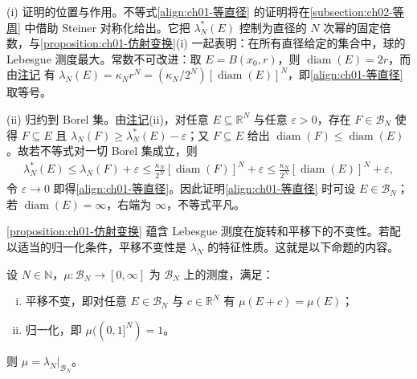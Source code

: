 \documentclass[../../main.tex]{subfiles}%
\begin{document}
\begin{remark}\label{remark:ch01-等直径注}
(i) 证明的位置与作用。不等式\eqref{align:ch01-等直径} 的证明将在\cref{subsection:ch02-等周} 中借助 Steiner 对称化给出。它把 $\lambda_N^*(E)$ 控制为直径的 $N$ 次幂的固定倍数，与\cref{proposition:ch01-仿射变换}(i) 一起表明：在所有直径给定的集合中，球的 Lebesgue 测度最大。常数不可改进：取 $E=B(x_0,r)$，则 $\operatorname{diam}(E)=2r$，而由\hyperref[remark:ch01-位似]{注记} 有 $\lambda_N(E)=\kappa_Nr^N=(\kappa_N/2^N)[\operatorname{diam}(E)]^N$，即\eqref{align:ch01-等直径} 取等号。

(ii) 归约到 Borel 集。由\hyperref[remark:ch01-Lebesgue性质]{注记}(ii)，对任意 $E\subseteq\mathbb{R}^N$ 与任意 $\varepsilon>0$，存在 $F\in\mathcal{B}_N$ 使得 $F\subseteq E$ 且 $\lambda_N(F)\geqslant\lambda_N^*(E)-\varepsilon$；又 $F\subseteq E$ 给出 $\operatorname{diam}(F)\leqslant\operatorname{diam}(E)$。故若不等式对一切 Borel 集成立，则
\begin{align*}
\lambda_N^*(E)\leqslant\lambda_N(F)+\varepsilon\leqslant\frac{\kappa_N}{2^N}[\operatorname{diam}(F)]^N+\varepsilon\leqslant\frac{\kappa_N}{2^N}[\operatorname{diam}(E)]^N+\varepsilon,
\end{align*}
令 $\varepsilon\to0$ 即得\eqref{align:ch01-等直径}。因此证明\eqref{align:ch01-等直径} 时可设 $E\in\mathcal{B}_N$；若 $\operatorname{diam}(E)=\infty$，右端为 $\infty$，不等式平凡。
\end{remark}

\cref{proposition:ch01-仿射变换} 蕴含 Lebesgue 测度在旋转和平移下的不变性。若配以适当的归一化条件，平移不变性是 $\lambda_N$ 的特征性质。这就是以下命题的内容。

\begin{proposition}\label{proposition:ch01-平移不变刻画}
设 $N\in\mathbb{N}$，$\mu:\mathcal{B}_N\to[0,\infty]$ 为 $\mathcal{B}_N$ 上的测度，满足：
\begin{enumerate}[(i)]
\item 平移不变，即对任意 $E\in\mathcal{B}_N$ 与 $c\in\mathbb{R}^N$ 有 $\mu(E+c)=\mu(E)$；
\item 归一化，即 $\mu((0,1]^N)=1$。
\end{enumerate}
则 $\mu=\lambda_N|_{\mathcal{B}_N}$。
\end{proposition}
\end{document}
